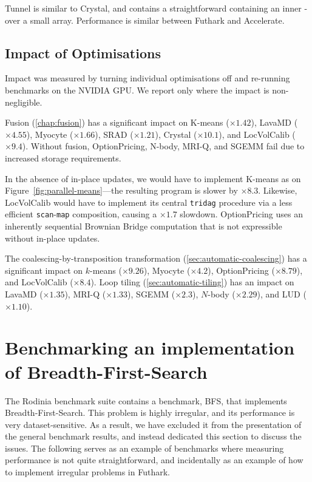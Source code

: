 Tunnel is similar to Crystal, and contains a straightforward 
containing an inner - over a small array.
Performance is similar between Futhark and Accelerate.

\subsection{Impact of Optimisations}
\label{sec:impact-of-optimisation}

Impact was measured by turning individual optimisations off and
re-running benchmarks on the NVIDIA GPU.  We report only where
the impact is non-negligible.

Fusion (\cref{chap:fusion}) has a significant impact on K-means
($\times1.42$), LavaMD ($\times4.55$), Myocyte ($\times1.66$), SRAD
($\times1.21$), Crystal ($\times10.1$), and LocVolCalib ($\times9.4$).
Without fusion, OptionPricing, N-body, MRI-Q, and SGEMM fail due to
increased storage requirements.

In the absence of in-place updates, we would have to implement K-means
as on Figure~\ref{fig:parallel-means}---the resulting program is
slower by $\times8.3$.  Likewise, LocVolCalib would have to implement
its central \lstinline{tridag} procedure via a less efficient
\lstinline{scan}-\lstinline{map} composition, causing a $\times1.7$
slowdown.  OptionPricing uses an inherently sequential Brownian Bridge
computation that is not expressible without in-place updates.

The coalescing-by-transposition transformation
(\cref{sec:automatic-coalescing}) has a significant impact on
$k$-means ($\times9.26$), Myocyte ($\times4.2$), OptionPricing
($\times 8.79$), and LocVolCalib ($\times 8.4$).
%
Loop tiling (\cref{sec:automatic-tiling}) has an impact on LavaMD
($\times 1.35$), MRI-Q ($\times1.33$), SGEMM ($\times2.3$), $N$-body
($\times 2.29$), and LUD ($\times 1.10$).

\section{Benchmarking an implementation of Breadth-First-Search}
\label{sec:bfs-benchmarking}

The Rodinia benchmark suite contains a benchmark, BFS, that
implements Breadth-First-Search.  This problem is highly irregular,
and its performance is very dataset-sensitive.  As a result, we have
excluded it from the presentation of the general benchmark results,
and instead dedicated this section to discuss the issues.  The
following serves as an example of benchmarks where measuring
performance is not quite straightforward, and incidentally as an
example of how to implement irregular problems in Futhark.

